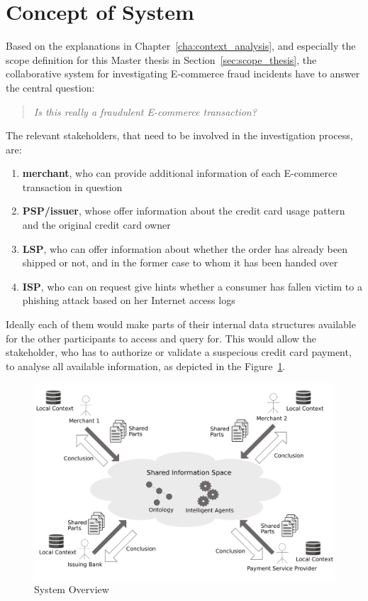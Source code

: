 
\section{Concept of System}
\label{sec:system_concept}

Based on the explanations in Chapter~\ref{cha:context_analysis}, and especially the scope definition for this Master thesis in Section~\ref{sec:scope_thesis}, the collaborative system for investigating E-commerce fraud incidents have to answer the central question:\@

\begin{quotation}
    \textit{Is this really a fraudulent E-commerce transaction?}
\end{quotation}

The relevant stakeholders, that need to be involved in the investigation process, are:\@

\begin{enumerate}
    \item \textbf{merchant}, who can provide additional information of each E-commerce transaction in question
    \item \textbf{\gls{PSP}/issuer}, whose offer information about the credit card usage pattern and the original credit card owner
    \item \textbf{\gls{LSP}}, who can offer information about whether the order has already been shipped or not, and in the former case to whom it has been handed over
    \item \textbf{\gls{ISP}}, who can on request give hints whether a consumer has fallen victim to a phishing attack based on her Internet access logs
\end{enumerate}

Ideally each of them would make parts of their internal data structures available for the other participants to access and query for. This would allow the stakeholder, who has to authorize or validate a suspecious credit card payment, to analyse all available information, as depicted in the Figure~\ref{fig:images_system_overview}.\@

\begin{figure}[H]
	\centering
		\includegraphics[width=0.9\columnwidth]{images/system_overview.pdf}
	\caption{System Overview}
\label{fig:images_system_overview}
\end{figure}

